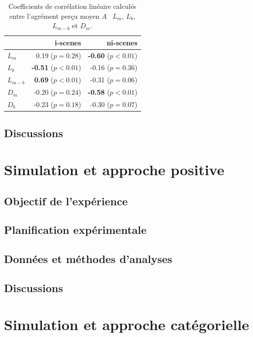 \begin{table}[t]
\centering
\begin{tabular}{l r r} 
                    &   i-scenes   & ni-scenes \\
\hline
$L_m$         & 0.19  ($p=0.28$)           & \textbf{-0.60} ($p<0.01$) \\
$L_b$         & \textbf{-0.51} ($p<0.01$)  & -0.16 ($p=0.36$) \\
$L_{m-b}$     & \textbf{0.69} ($p<0.01$)   & -0.31 ($p=0.06$) \\
$D_{m}$       & -0.20  ($p=0.24$)          & \textbf{-0.58} ($p<0.01$)  \\
$D_{b}$       & -0.23  ($p=0.18$)          & -0.30 ($p=0.07$)  \\
\hline
\end{tabular}
\vspace{0.5mm}
\caption{Coefficients de corrélation linéaire calculés entre l'agrément perçu moyen $A$ \vs~$L_m$, $L_b$, $L_{m-b}$ et $D_m$.}
\label{tab:coorMarkers}
\end{table}

\subsection{Discussions}

\section{Simulation et approche positive}
\label{sec:xp3}

\subsection{Objectif de l'expérience}

\subsection{Planification expérimentale}

\subsection{Données et méthodes d'analyses}

\subsection{Discussions}

\section{Simulation et approche catégorielle}
\label{sec:xp4}

